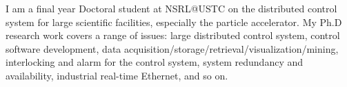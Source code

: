 

I am a final year Doctoral student at NSRL@USTC on the distributed control system for large scientific facilities, especially the particle accelerator. My Ph.D research work covers a range of issues: large distributed control system, control software development, data acquisition/storage/retrieval/visualization/mining, interlocking and alarm for the control system, system redundancy and availability, industrial real-time Ethernet, and so on. 

